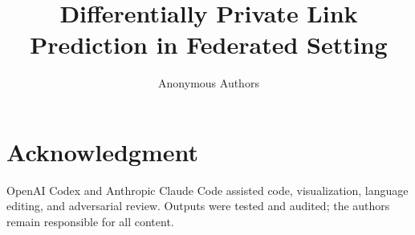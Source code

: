 \documentclass[journal]{IEEEtran}
\title{Differentially Private Link Prediction in Federated Setting}
\author{Anonymous Authors}
\begin{document}
\maketitle











\section*{Acknowledgment}
OpenAI Codex and Anthropic Claude Code assisted code, visualization, language
editing, and adversarial review. Outputs were tested and audited; the authors
remain responsible for all content.

\appendices




\end{document}
